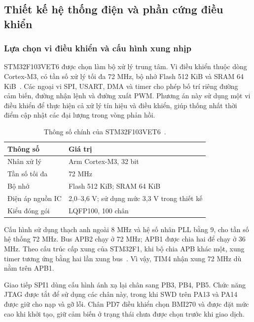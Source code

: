\subsection{Thiết kế hệ thống điện và phần cứng điều khiển}
\label{sec:design-electronics}

\subsubsection{Lựa chọn vi điều khiển và cấu hình xung nhịp}

STM32F103VET6 được chọn làm bộ xử lý trung tâm. Vi điều khiển thuộc dòng Cortex-M3, có tần số xử lý tối đa 72 MHz, bộ nhớ Flash 512 KiB và SRAM 64 KiB~\cite{stm32f103veDatasheet}. Các ngoại vi SPI, USART, DMA và timer cho phép bố trí riêng đường cảm biến, đường nhận lệnh và đường xuất PWM. Phương án này sử dụng một vi điều khiển để thực hiện cả xử lý tín hiệu và điều khiển, giúp thống nhất thời điểm cập nhật các đại lượng trong vòng phản hồi.

\begin{table}[htbp]
	\centering
	\caption{Thông số chính của STM32F103VET6~\cite{stm32f103veDatasheet}.}
	\label{tab:design-mcu-specifications}
	\begin{tabularx}{\linewidth}{|C{4.2cm}|Y|}
		\hline
		\textbf{Thông số} & \textbf{Giá trị}                             \\
		\hline
		Nhân xử lý        & Arm Cortex-M3, 32 bit                        \\
		\hline
		Tần số tối đa     & 72 MHz                                       \\
		\hline
		Bộ nhớ            & Flash 512 KiB; SRAM 64 KiB                   \\
		\hline
		Điện áp nguồn IC  & 2,0--3,6 V; sử dụng mức 3,3 V trong thiết kế \\
		\hline
		Kiểu đóng gói     & LQFP100, 100 chân                            \\
		\hline
	\end{tabularx}
\end{table}

Cấu hình sử dụng thạch anh ngoài 8 MHz và hệ số nhân PLL bằng 9, cho tần số hệ thống 72 MHz. Bus APB2 chạy ở 72 MHz; APB1 được chia hai để chạy ở 36 MHz. Theo cấu trúc cấp xung của STM32F1, khi bộ chia APB khác một, xung timer tương ứng bằng hai lần xung bus~\cite{stm32Rm0008}. Vì vậy, TIM4 nhận xung 72 MHz dù nằm trên APB1.

Giao tiếp SPI1 dùng cấu hình ánh xạ lại chân sang PB3, PB4, PB5. Chức năng JTAG được tắt để sử dụng các chân này, trong khi SWD trên PA13 và PA14 được giữ cho nạp và gỡ lỗi. Chân PD7 điều khiển chọn BMI270 và được đặt mức cao khi khởi tạo, giữ cảm biến ở trạng thái chưa được chọn trước khi giao dịch.

